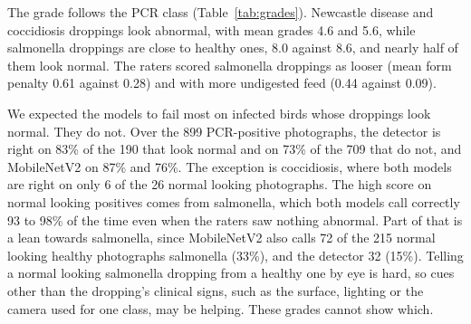 \begin{table}[t]
\centering
\caption{Appearance grade and model accuracy (top class equals the PCR class) on the lab-confirmed photographs. Normal looking means grade 9 or 10.
$n$ excludes the nine photographs no rater could judge. Detector is our YOLO11n scored on its top class (always answers). Bold marks the values discussed in the text. $^{*}$Only one Newcastle photograph looks normal.}
\label{tab:grades}
\end{table}

The grade follows the PCR class (Table~\ref{tab:grades}). Newcastle disease and coccidiosis droppings look
abnormal, with mean grades 4.6 and 5.6, while salmonella droppings are close to healthy ones, 8.0 against 8.6,
and nearly half of them look normal. The raters scored salmonella droppings as looser (mean form penalty 0.61
against 0.28) and with more undigested feed (0.44 against 0.09).

We expected the models to fail most on infected birds whose droppings look normal. They do not. Over the 899
PCR-positive photographs, the detector is right on 83\% of the 190 that look normal and on 73\% of the 709 that
do not, and MobileNetV2 on 87\% and 76\%. The exception is coccidiosis, where both models are right on only 6 of
the 26 normal looking photographs. The high score on normal looking positives comes from salmonella, which both
models call correctly 93 to 98\% of the time even when the raters saw nothing abnormal. Part of that is a lean
towards salmonella, since MobileNetV2 also calls 72 of the 215 normal looking healthy photographs salmonella
(33\%), and the detector 32 (15\%). Telling a normal looking salmonella dropping from a healthy one by eye is
hard, so cues other than the dropping's clinical signs, such as the surface, lighting or the camera used for one
class, may be helping. These grades cannot show which.

